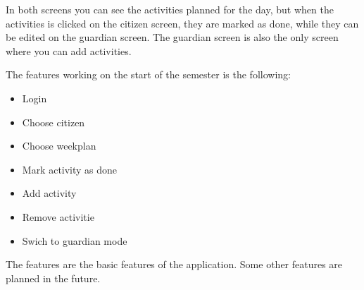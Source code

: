 In both screens you can see the activities planned for the day, but when the activities is clicked on the citizen screen, they are marked as done, while they can be edited on the guardian screen. The guardian screen is also the only screen where you can add activities.

The features working on the start of the semester is the following:
\begin{itemize}
    \item Login 
    \item Choose citizen 
    \item Choose weekplan
    \item Mark activity as done 
    \item Add activity
    \item Remove activitie
    \item Swich to guardian mode
\end{itemize}

The features are the basic features of the application. Some other features are planned in the future. 